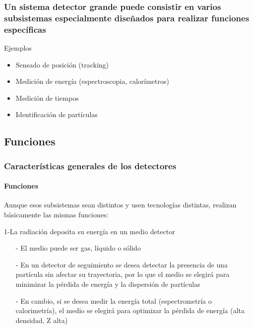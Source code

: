 \documentclass{beamer}
\begin{document}
\begin{frame}
\frametitle{Un sistema detector grande puede consistir en varios
subsistemas especialmente diseñados para realizar funciones espec\'ificas}
\begin{exampleblock}{Ejemplos}
\begin{itemize}
\item Sensado de posici\'on (tracking)
\item Medici\'on de energ\'ia (espectroscopia, calor\'imetros)
\item Medici\'on de tiempos
\item Identificaci\'on de part\'iculas
\end{itemize}
\end{exampleblock}
\end{frame} 

\subsection{Funciones}

\begin{frame}
\frametitle{Caracter\'isticas generales de los detectores}
\framesubtitle{{\color{blue}Funciones}}
\begin{exampleblock}{}
Aunque esos subsistemas sean distintos y usen tecnolog\'ias
distintas, realizan b\'asicamente las mismas funciones:
\end{exampleblock}
\begin{block}{1-La radiaci\'on deposita su energ\'ia en un medio detector}
\begin{itemize}
\item[-] El medio puede ser {\color[rgb]{0.82,0.1,0.26}gas, l\'iquido o s\'olido}

\item[-] En un detector de seguimiento se desea detectar la presencia de una part\'icula
sin afectar su trayectoria, por lo que \alert{el medio se elegir\'a para minimizar la
p\'erdida de energ\'ia y la dispersi\'on de part\'iculas}

\item[-]En cambio, si se desea medir la energ\'ia total (espectrometr\'ia o calorimetr\'ia),
el medio se elegir\'a para optimizar la p\'erdida de energ\'ia (alta densidad, Z alta)
\end{itemize}
\end{block}
\end{frame} 
\end{document}
